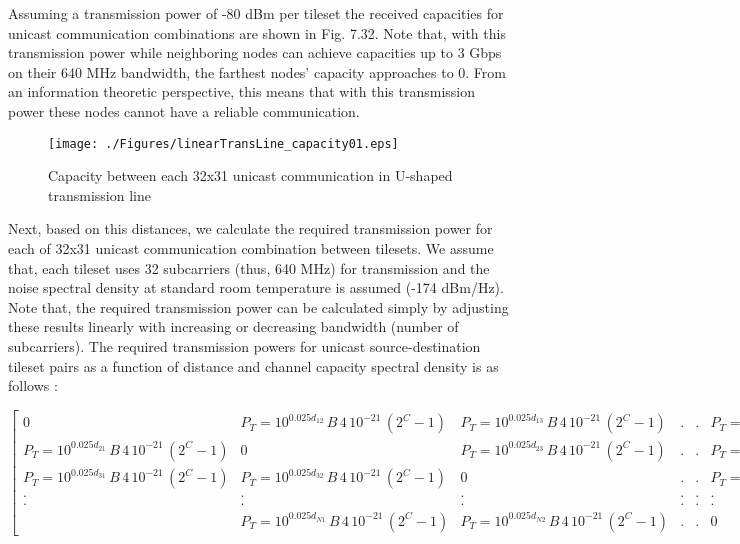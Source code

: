 
Assuming a transmission power of -80 dBm per tileset the received capacities for unicast communication combinations are shown in Fig. 7.32. Note that, with this transmission power while neighboring nodes can achieve capacities up to 3 Gbps on their 640 MHz bandwidth, the farthest nodes' capacity approaches to 0. From an information theoretic perspective, this means that with this transmission power these nodes cannot have a reliable communication.

\begin{figure}[t!]
  \centering
    \texttt{[image: ./Figures/linearTransLine\_capacity01.eps]}
  \caption[Capacity between each 32x31 unicast communication in U-shaped transmission line]{Capacity between each 32x31 unicast communication in U-shaped transmission line}
  \label{fig:Electron}
\end{figure}

Next, based on this distances, we calculate the required transmission power for each of 32x31 unicast communication combination between tilesets. We assume that, each tileset uses 32 subcarriers (thus, 640 MHz) for transmission and the noise spectral density at standard room temperature is assumed (-174 dBm/Hz). Note that, the required transmission power can be calculated simply by adjusting these results linearly with increasing or decreasing bandwidth (number of subcarriers). The required transmission powers for unicast source-destination tileset pairs as a function of distance and channel capacity spectral density is as follows :

\bigskip
\resizebox{1.0\linewidth}{!}
{
$\begin{bmatrix}
 0  &P_{T} = 10^{0.025d_{12}}\,B\,4\,10^{-21}\,(2^{C}-1)  &P_{T} = 10^{0.025d_{13}}\,B\,4\,10^{-21}\,(2^{C}-1)  &.  &. &P_{T} = 10^{0.025d_{1N}}\,B\,4\,10^{-21}\,(2^{C}-1) \\ 
P_{T} = 10^{0.025d_{21}}\,B\,4\,10^{-21}\,(2^{C}-1) &0   &P_{T} = 10^{0.025d_{23}}\,B\,4\,10^{-21}\,(2^{C}-1)  &.  &. &P_{T} = 10^{0.025d_{2N}}\,B\,4\,10^{-21}\,(2^{C}-1) \\ 
P_{T} = 10^{0.025d_{31}}\,B\,4\,10^{-21}\,(2^{C}-1)   &P_{T} = 10^{0.025d_{32}}\,B\,4\,10^{-21}\,(2^{C}-1)  &0 &.  &. &P_{T} = 10^{0.025d_{3N}}\,B\,4\,10^{-21}\,(2^{C}-1) \\ 
 .  &. &.  &. &.  &. \\ 
 .  &. &.  &. &.  &. \\ 
  &P_{T} = 10^{0.025d_{N1}}\,B\,4\,10^{-21}\,(2^{C}-1)  &P_{T} = 10^{0.025d_{N2}}\,B\,4\,10^{-21}\,(2^{C}-1) &. &.  &0  
\end{bmatrix}$
}
\bigskip


